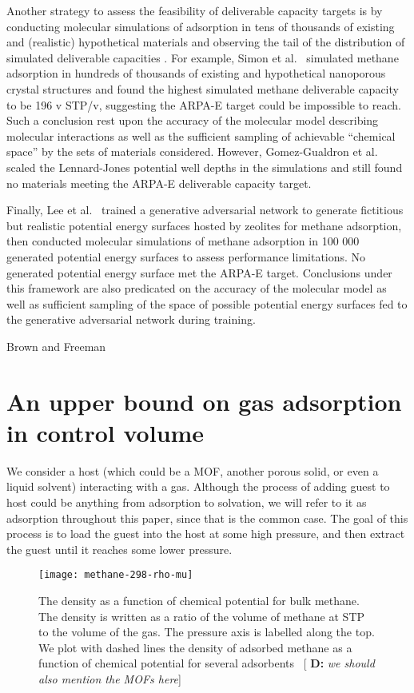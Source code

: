 \documentclass{nature}
\newcommand{\blue}[1]{{\bf \color{blue} #1}}
\newcommand{\davidsays}[1]{{\color{red} [\blue{D:} \emph{#1}]}}
\begin{document}
Another strategy to assess the feasibility of deliverable capacity targets is by conducting molecular simulations of adsorption in tens of thousands of existing and (realistic) hypothetical materials and observing the tail of the distribution of simulated deliverable capacities \cite{gomez2014exploring,simon2015materials}. For example, Simon et al.\ \cite{simon2015materials} simulated methane adsorption in hundreds of thousands of existing and hypothetical nanoporous crystal structures and found the highest simulated methane deliverable capacity to be 196 v STP/v, suggesting the ARPA-E target could be impossible to reach. Such a conclusion rest upon the accuracy of the molecular model describing molecular interactions as well as the sufficient sampling of achievable ``chemical space'' by the sets of materials considered. However, Gomez-Gualdron et al.\ \cite{gomez2014exploring} scaled the Lennard-Jones potential well depths in the simulations and still found no materials meeting the ARPA-E deliverable capacity target.

Finally, Lee et al.\ \cite{lee2019predicting} trained a generative adversarial network to generate fictitious but realistic potential energy surfaces hosted by zeolites for methane adsorption, then conducted molecular simulations of methane adsorption in 100 000 generated potential energy surfaces to assess performance limitations. No generated potential energy surface met the ARPA-E target. Conclusions under this framework are also predicated on the accuracy of the molecular model as well as sufficient sampling of the space of possible potential energy surfaces fed to the generative adversarial network during training. 

Brown and Freeman \cite{bhown2011analysis}

\section{An upper bound on gas adsorption in control volume}
We consider a host (which could be a MOF, another porous solid, or even a liquid solvent) interacting with a gas.  Although the process of adding guest to host could be anything from adsorption to solvation, we will refer to it as adsorption throughout this paper, since that is the common case.  The goal of this process is to load the guest into the host at some high pressure, and then extract the guest until it reaches some lower pressure.

\begin{figure}
  \centering
  \texttt{[image: methane-298-rho-mu]}
  \caption{The density as a function of chemical potential for bulk
    methane.  The density is written as a ratio of the volume of
    methane at STP to the volume of the gas. The pressure axis is labelled
    along the top.  We plot with dashed lines the density of adsorbed
    methane as a function of chemical potential for several
    adsorbents~\cite{long} \davidsays{we should also mention the MOFs
      here}}
  \label{fig:density-vs-mu-ch4}
\end{figure}
\end{document}
